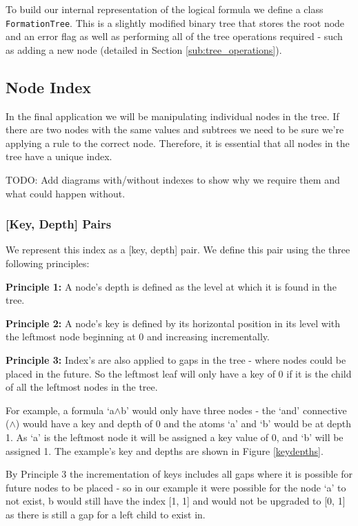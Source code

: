 \documentclass{report}
\begin{document}
To build our internal representation of the logical formula we define a class {\tt FormationTree}. This is a slightly modified binary tree that stores the root node and an error flag as well as performing all of the tree operations required - such as adding a new node (detailed in Section \ref{sub:tree_operations}).

\subsection{Node Index}
\label{sub:node_index}

In the final application we will be manipulating individual nodes in the tree. If there are two nodes with the same values and subtrees we need to be sure we're applying a rule to the correct node. Therefore, it is essential that all nodes in the tree have a unique index.

TODO: Add diagrams with/without indexes to show why we require them and what could happen without.

\subsubsection{[Key, Depth] Pairs}

We represent this index as a [key, depth] pair. We define this pair using the three following principles:

\textbf{Principle 1:} A node's depth is defined as the level at which it is found in the tree. 

\textbf{Principle 2:} A node's key is defined by its horizontal position in its level with the leftmost node beginning at 0 and increasing incrementally.

\textbf{Principle 3:} Index's are also applied to gaps in the tree - where nodes could be placed in the future. So the leftmost leaf will only have a key of 0 if it is the child of all the leftmost nodes in the tree.

For example, a formula `a$\land$b' would only have three nodes - the `and' connective ($\land$) would have a key and depth of 0 and the atoms `a' and `b' would be at depth 1. As `a' is the leftmost node it will be assigned a key value of 0, and `b' will be assigned 1. The example's key and depths are shown in Figure \ref{keydepths}. 

By Principle 3 the incrementation of keys includes all gaps where it is possible for future nodes to be placed - so in our example it were possible for the node `a' to not exist, b would still have the index [1, 1] and would not be upgraded to [0, 1] as there is still a gap for a left child to exist in.
\end{document}

